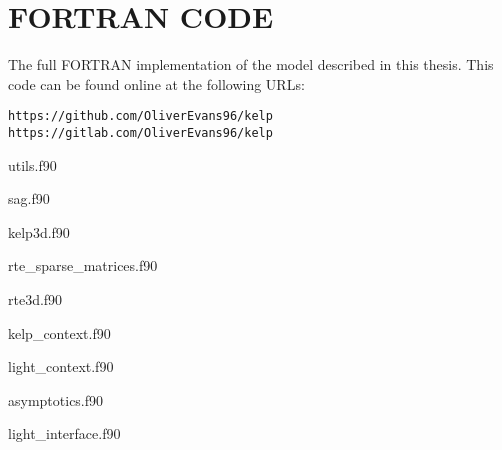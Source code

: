 \chapter{FORTRAN CODE}
\label{chap:fortran}

The full FORTRAN implementation of the model described in this thesis.
This code can be found online at the following URLs:

\begin{verbatim}
https://github.com/OliverEvans96/kelp
https://gitlab.com/OliverEvans96/kelp
\end{verbatim}

utils.f90


sag.f90


kelp3d.f90


rte\_sparse\_matrices.f90


rte3d.f90


kelp\_context.f90


light\_context.f90


asymptotics.f90


light\_interface.f90


